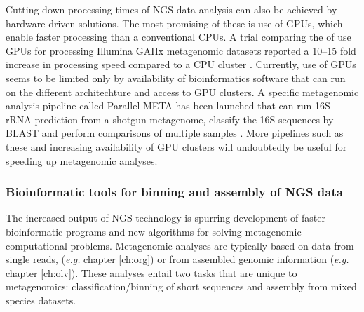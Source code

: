 Cutting down processing times of \ac{NGS} data analysis can also be achieved by hardware-driven solutions.
The most promising of these is use of \acp{GPU}, which enable faster processing than a conventional \acp{CPU}.
A trial comparing the of use \acp{GPU} for processing Illumina GAIIx metagenomic datasets reported a 10--15 fold increase in processing speed compared to a \ac{CPU} cluster \cite{Su2012}.
Currently, use of \acp{GPU} seems to be limited only by availability of bioinformatics software that can run on the different architechture and access to \ac{GPU} clusters.
A specific metagenomic analysis pipeline called Parallel-META has been launched that can run 16S \acs{rRNA} prediction from a shotgun metagenome, classify the 16S sequences by \acs{BLAST} and perform comparisons of multiple samples \cite{Su2012}.
More pipelines such as these and increasing availability of \ac{GPU} clusters will undoubtedly be useful for speeding up metagenomic analyses.

\subsubsection{Bioinformatic tools for binning and assembly of \acs{NGS} data}
The increased output of \ac{NGS} technology is spurring development of faster bioinformatic programs and new algorithms for solving metagenomic computational problems.
Metagenomic analyses are typically based on data from single reads, (\emph{e.g.} chapter \ref{ch:org}) or from assembled genomic information (\emph{e.g.} chapter \ref{ch:olv}).
These analyses entail two tasks that are unique to metagenomics: classification/binning of short sequences and assembly from mixed species datasets. 

